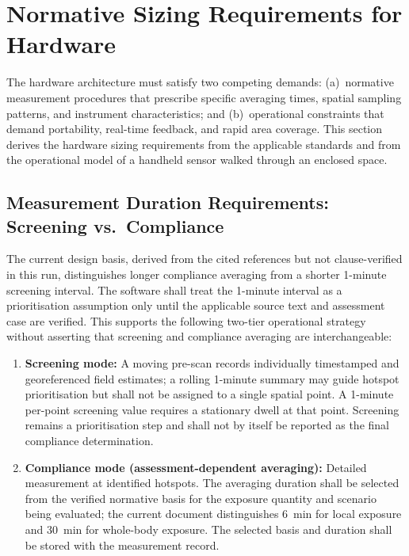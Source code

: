 \documentclass[11pt,a4paper]{article}
\begin{document}
\section{Normative Sizing Requirements for Hardware}
\label{sec:normative_requirements}

The hardware architecture must satisfy two competing demands: (a)~normative measurement procedures that prescribe specific averaging times, spatial sampling patterns, and instrument characteristics; and (b)~operational constraints that demand portability, real-time feedback, and rapid area coverage. This section derives the hardware sizing requirements from the applicable standards and from the operational model of a handheld sensor walked through an enclosed space.

\subsection{Measurement Duration Requirements: Screening vs.~Compliance}

The current design basis, derived from the cited references but not clause-verified in this run, distinguishes longer compliance averaging from a shorter 1-minute screening interval. The software shall treat the 1-minute interval as a prioritisation assumption only until the applicable source text and assessment case are verified. This supports the following two-tier operational strategy without asserting that screening and compliance averaging are interchangeable:

\begin{enumerate}
    \item \textbf{Screening mode:} A moving pre-scan records individually timestamped and georeferenced field estimates; a rolling 1-minute summary may guide hotspot prioritisation but shall not be assigned to a single spatial point. A 1-minute per-point screening value requires a stationary dwell at that point. Screening remains a prioritisation step and shall not by itself be reported as the final compliance determination.
    \item \textbf{Compliance mode (assessment-dependent averaging):} Detailed measurement at identified hotspots. The averaging duration shall be selected from the verified normative basis for the exposure quantity and scenario being evaluated; the current document distinguishes 6~min for local exposure and 30~min for whole-body exposure. The selected basis and duration shall be stored with the measurement record.
\end{enumerate}
\end{document}
